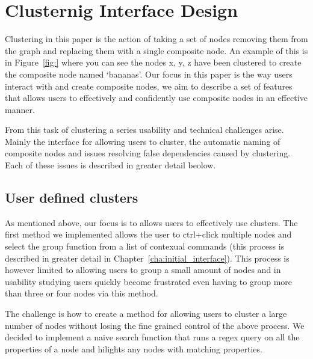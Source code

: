 \chapter{Clusternig Interface Design}


Clustering in this paper is the action of taking a set of nodes removing them from the graph and replacing them with a single composite node. An example of this is in
Figure~\ref{fig:} where you can see the nodes x, y, z have been clustered to create the composite node named `bananas'. Our focus in this paper is the way users interact with and create composite nodes, we aim to describe a set of features that allows users to effectively and confidently use composite nodes in an effective manner.

From this task of clustering a series usability and technical challenges arise. Mainly the interface for allowing users to cluster, the automatic naming of composite nodes and issues resolving false dependencies caused by clustering. Each of these issues is described in greater detail beolow.

\section{User defined clusters}
\label{sec:user_defined_clusters}

As mentioned above, our focus is to allows users to effectively use clusters. The first method we implemented allows the user to ctrl+click multiple nodes and select the group function from a list of contexual commands (this process is described in
greater detail in Chapter~\ref{cha:initial_interface}). This process is however limited to allowing users to group a small amount of nodes and in usability studying users quickly become frustrated even having to group more than three or four nodes via this method.

The challenge is how to create a method for allowing users to cluster a large number of nodes without losing the fine grained control of the above process. We decided to implement a naive search function that runs a regex query on all the properties of a node and hilights any nodes with matching properties.


